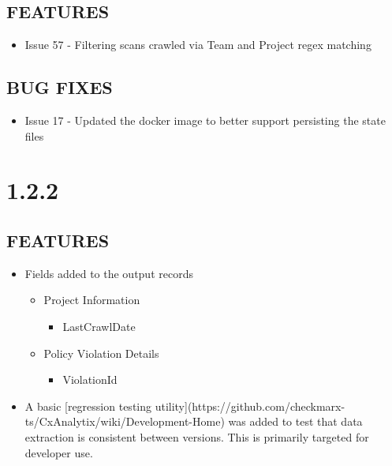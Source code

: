 \subsection*{FEATURES}
    \begin{itemize}
        \item Issue 57 - Filtering scans crawled via Team and Project regex matching
    \end{itemize}
\subsection*{BUG FIXES}
    \begin{itemize}
        \item Issue 17 - Updated the docker image to better support persisting the state files
    \end{itemize}


\section{1.2.2}
\subsection*{FEATURES}
    \begin{itemize}
        \item Fields added to the output records
        \begin{itemize}
            \item Project Information
            \begin{itemize}
                \item LastCrawlDate
            \end{itemize}
        \end{itemize}
        \begin{itemize}
            \item Policy Violation Details
            \begin{itemize}
                \item ViolationId
            \end{itemize}
        \end{itemize}
        \item A basic [regression testing utility](https://github.com/checkmarx-ts/CxAnalytix/wiki/Development-Home) was added to test that data extraction is consistent between versions.  This is primarily targeted for developer use.
    \end{itemize}

